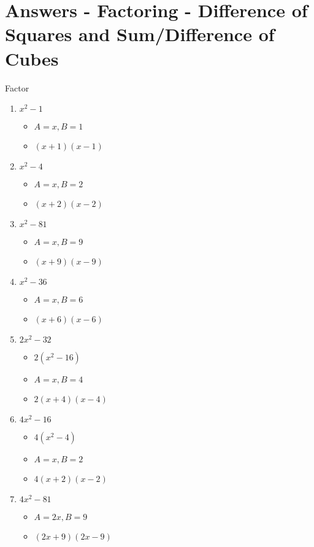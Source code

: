 \documentclass{article}
\begin{document}
\section{Answers - Factoring - Difference of Squares and Sum/Difference of Cubes}
Factor\\
\begin{enumerate}
\item $x^{2} - 1$
  \begin{itemize}
  \item $A=x, B=1$
  \item $(x+1)(x-1)$
  \end{itemize}
\item $x^{2} - 4$
  \begin{itemize}
  \item $A=x, B=2$
  \item $(x+2)(x-2)$
  \end{itemize}
\item $x^{2} - 81$
  \begin{itemize}
  \item $A=x, B=9$
  \item $(x+9)(x-9)$
  \end{itemize}
\item $x^{2} - 36$
  \begin{itemize}
  \item $A=x, B=6$
  \item $(x+6)(x-6)$
  \end{itemize}
\item $2x^{2} - 32$
  \begin{itemize}
  \item $2(x^{2}-16)$
  \item $A=x, B=4$
  \item $2(x+4)(x-4)$
  \end{itemize}
\item $4x^{2} - 16$
  \begin{itemize}
  \item $4(x^{2}-4)$
  \item $A=x, B=2$
  \item $4(x+2)(x-2)$
  \end{itemize}
\item $4x^{2} - 81$
  \begin{itemize}
  \item $A=2x, B=9$
  \item $(2x+9)(2x-9)$
  \end{itemize}

\end{enumerate}
\end{document}
